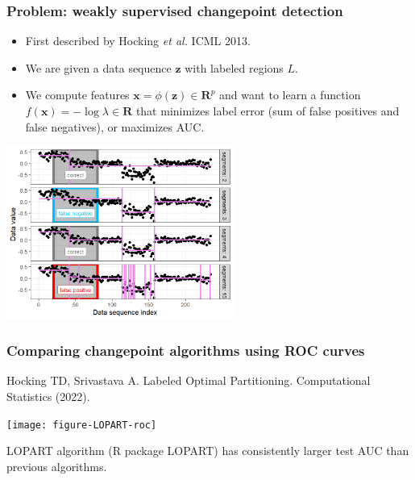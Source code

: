 \documentclass[t]{beamer}
\begin{document}
\begin{frame}
  \frametitle{Problem: weakly supervised changepoint detection}
  \begin{itemize}
  \item First described by Hocking \emph{et al.} ICML 2013.
  \item We are given a data sequence $\mathbf z$ with labeled regions
    $L$.
  \item \alert<2>{We compute features $\mathbf x=\phi(\mathbf z)\in\mathbf R^p$
    and want to learn a function $f(\mathbf x)=-\log\lambda\in\mathbf R$ that minimizes label error (sum of false positives and false negatives), or maximizes AUC.}
  \end{itemize}

  \includegraphics[width=0.56\textwidth]{figure-fn-not-monotonic}

\end{frame}

\begin{frame}
  \frametitle{Comparing changepoint algorithms using ROC curves}
  Hocking TD, Srivastava A. Labeled Optimal
  Partitioning. Computational Statistics (2022).
  
  \texttt{[image: figure-LOPART-roc]}

  LOPART algorithm (R package LOPART) has consistently larger
  test AUC than previous algorithms.
\end{frame}
\end{document}

